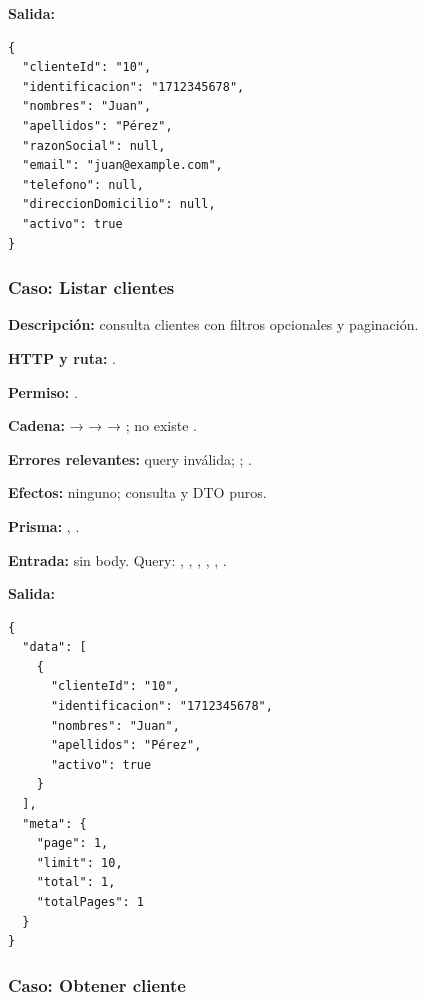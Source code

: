 \textbf{Salida:}


\begin{lstlisting}
{
  "clienteId": "10",
  "identificacion": "1712345678",
  "nombres": "Juan",
  "apellidos": "Pérez",
  "razonSocial": null,
  "email": "juan@example.com",
  "telefono": null,
  "direccionDomicilio": null,
  "activo": true
}
\end{lstlisting}


\subsubsection{Caso: Listar clientes}


\textbf{Descripción:} consulta clientes con filtros opcionales y paginación.


\textbf{HTTP y ruta:} \texttt{}.


\textbf{Permiso:} \texttt{}.


\textbf{Cadena:} \texttt{} → \texttt{} → \texttt{} → \texttt{}; no existe \texttt{}.


\textbf{Errores relevantes:} \texttt{} query inválida; \texttt{}; \texttt{}.


\textbf{Efectos:} ninguno; consulta y DTO puros.


\textbf{Prisma:} \texttt{}, \texttt{}.


\textbf{Entrada:} sin body. Query: \texttt{}, \texttt{}, \texttt{}, \texttt{}, \texttt{}, \texttt{}.


\textbf{Salida:}


\begin{lstlisting}
{
  "data": [
    {
      "clienteId": "10",
      "identificacion": "1712345678",
      "nombres": "Juan",
      "apellidos": "Pérez",
      "activo": true
    }
  ],
  "meta": {
    "page": 1,
    "limit": 10,
    "total": 1,
    "totalPages": 1
  }
}
\end{lstlisting}


\subsubsection{Caso: Obtener cliente}


